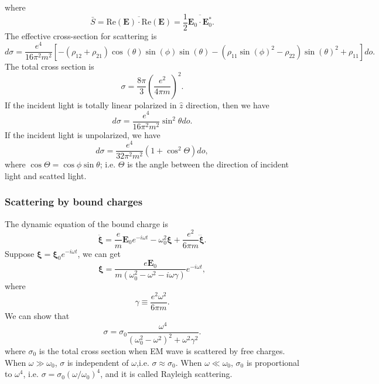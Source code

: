 where
\[\bar{S} = \overline{\mathrm{Re}(\bm{E})\cdot \mathrm{Re}(\bm{E})} = \frac{1}{2}\overline{\bm{E}_0 \cdot \bm{E}^*_0}.\]
The effective cross-section for scattering is
\[d\sigma = \frac{e^4}{16\pi^2 m^2}[-(\rho_{12}+\rho_{21})\cos\left({\theta}\right)\sin\left({\phi}\right)
\sin\left({\theta}\right) - {\left(\rho_{11} \sin\left({\phi}\right)^{2}
- \rho_{22}\right)} \sin\left({\theta}\right)^{2} + \rho_{11} ]do.\]
The total cross section is
\[\sigma = \frac{8\pi}{3} \left( \frac{e^2}{4\pi m} \right)^2.\]
If the incident light is totally linear polarized in $\hat{z}$ direction, then we have
\[d\sigma = \frac{e^4}{16\pi^2 m^2} \sin^2\theta do.\]
If the incident light is unpolarized, we have
\[d\sigma = \frac{e^4}{32\pi^2 m^2}\left(1 +  \cos^2\Theta \right)do,\]
where $\cos\Theta = \cos\phi\sin\theta$; i.e. $\Theta$ is the angle between the direction of incident light and scatted light.

\subsubsection{Scattering by bound charges}
The dynamic equation of the bound charge is
\[\ddot{\bm{\xi}} = \frac{e}{m}\bm{E}_0e^{-i\omega t} - \omega_0^2 \bm{\xi} + \frac{e^2}{6\pi m} \dddot{\bm{\xi}}.\]
Suppose $\bm{\xi} = \bm{\xi}_0 e^{-i\omega t}$, we can get
\[\bm{\xi} = \frac{e\bm{E}_0}{m(\omega_0^2 - \omega^2 - i\omega \gamma)} e^{-i\omega t},\]
where
\[\gamma \equiv \frac{e^2 \omega^2}{6\pi m}.\]
We can show that
\[\sigma = \sigma_0 \frac{\omega^4}{(\omega_0^2-\omega^2)^2 + \omega^2 \gamma^2}.\]
where $\sigma_0$ is the total cross section when EM wave is scattered by free charges. When $\omega \gg \omega_0$, $\sigma$ is independent of $\omega$,i.e. $\sigma \approx \sigma_0$. When $\omega \ll \omega_0$, $\sigma_0$ is proportional to $\omega^4$, i.e. $\sigma = \sigma_0 \left({\omega}/{\omega_0}\right)^4$, and it is called Rayleigh scattering.
